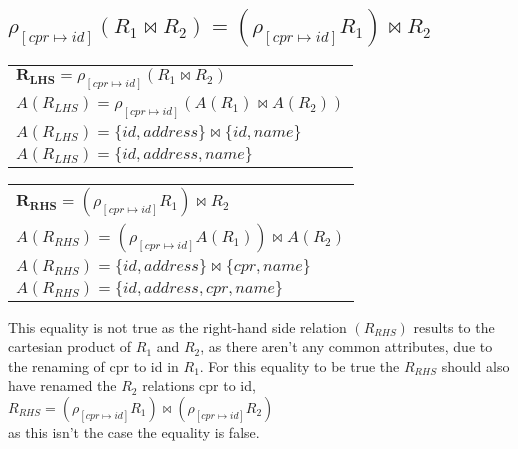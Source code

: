 \subsection{\normalsize{$\rho_{[cpr\mapsto id]}(R_1 \Join R_2) = (\rho_{[cpr\mapsto id]} R_1) \Join R_2$}}

\begin{table}[ht]
	\begin{tabular}{|l|}
		$\bm{R_{LHS}} = \rho_{[cpr\mapsto id]}(R_1 \Join R_2)$ \\[0.2cm]
		$A(R_{LHS}) = \rho_{[cpr\mapsto id]}(A(R_1) \Join A(R_2))$  \\[0.2cm]
		$A(R_{LHS}) = \{id, address\} \Join \{id, name\}$  \\[0.2cm]
		$A(R_{LHS}) = \{id, address, name\}$
	\end{tabular}
\end{table}

\begin{table}[ht]
	\begin{tabular}{|l|}
		$\bm{R_{RHS}} = (\rho_{[cpr\mapsto id]} R_1) \Join R_2$ \\[0.2cm]
		$A(R_{RHS}) = (\rho_{[cpr\mapsto id]}A(R_1)) \Join A(R_2)$ \\[0.2cm]
		$A(R_{RHS}) = \{id, address\} \Join \{cpr, name\}$ \\[0.2cm]
		$A(R_{RHS}) = \{id, address, cpr, name\}$
	\end{tabular}
\end{table}
\FloatBarrier

This equality is not true as the right-hand side relation $(R_{RHS})$ results to the cartesian product of $R_1$ and $R_2$, as there aren't any common attributes, due to the renaming of cpr to id in $R_1$.
For this equality to be true the $R_{RHS}$ should also have renamed the $R_2$ relations cpr to id,\\
$R_{RHS} = (\rho_{[cpr\mapsto id]} R_1) \Join (\rho_{[cpr\mapsto id]} R_2)$\\
as this isn't the case the equality is false.\\\\
